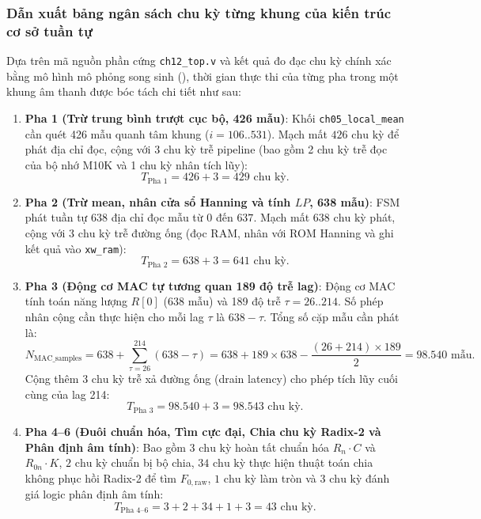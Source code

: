 \subsubsection*{Dẫn xuất bảng ngân sách chu kỳ từng khung của kiến trúc cơ sở tuần tự}
Dựa trên mã nguồn phần cứng \texttt{ch12\_top.v} và kết quả đo đạc chu kỳ chính xác bằng mô hình mô phỏng song sinh (), thời gian thực thi của từng pha trong một khung âm thanh được bóc tách chi tiết như sau:

\begin{enumerate}
    \item \textbf{Pha 1 (Trừ trung bình trượt cục bộ, 426 mẫu)}:
    Khối \texttt{ch05\_local\_mean} cần quét 426 mẫu quanh tâm khung ($i = 106..531$). Mạch mất $426\text{ chu kỳ}$ để phát địa chỉ đọc, cộng với $3\text{ chu kỳ}$ trễ pipeline (bao gồm 2 chu kỳ trễ đọc của bộ nhớ M10K và 1 chu kỳ nhân tích lũy):
    \begin{equation}
        T_{\text{Pha 1}} = 426 + 3 = 429\text{ chu kỳ}.
    \end{equation}

    \item \textbf{Pha 2 (Trừ mean, nhân cửa sổ Hanning và tính $LP$, 638 mẫu)}:
    FSM phát tuần tự 638 địa chỉ đọc mẫu từ $0$ đến $637$. Mạch mất $638\text{ chu kỳ}$ phát, cộng với $3\text{ chu kỳ}$ trễ đường ống (đọc RAM, nhân với ROM Hanning và ghi kết quả vào \texttt{xw\_ram}):
    \begin{equation}
        T_{\text{Pha 2}} = 638 + 3 = 641\text{ chu kỳ}.
    \end{equation}

    \item \textbf{Pha 3 (Động cơ MAC tự tương quan 189 độ trễ lag)}:
    Động cơ MAC tính toán năng lượng $R[0]$ (638 mẫu) và 189 độ trễ $\tau = 26..214$. Số phép nhân cộng cần thực hiện cho mỗi lag $\tau$ là $638 - \tau$. Tổng số cặp mẫu cần phát là:
    \begin{equation}
        N_{\text{MAC\_samples}} = 638 + \sum_{\tau=26}^{214} (638 - \tau) = 638 + 189 \times 638 - \frac{(26 + 214) \times 189}{2} = 98.540\text{ mẫu}.
    \end{equation}
    Cộng thêm $3\text{ chu kỳ}$ trễ xả đường ống (drain latency) cho phép tích lũy cuối cùng của lag 214:
    \begin{equation}
        T_{\text{Pha 3}} = 98.540 + 3 = 98.543\text{ chu kỳ}.
    \end{equation}

    \item \textbf{Pha 4--6 (Đuôi chuẩn hóa, Tìm cực đại, Chia chu kỳ Radix-2 và Phân định âm tính)}:
    Bao gồm $3\text{ chu kỳ}$ hoàn tất chuẩn hóa $R_n \cdot C$ và $R_{0n} \cdot K$, $2\text{ chu kỳ}$ chuẩn bị bộ chia, $34\text{ chu kỳ}$ thực hiện thuật toán chia không phục hồi Radix-2 để tìm $F_{0,\text{raw}}$, $1\text{ chu kỳ}$ làm tròn và $3\text{ chu kỳ}$ đánh giá logic phân định âm tính:
    \begin{equation}
        T_{\text{Pha 4--6}} = 3 + 2 + 34 + 1 + 3 = 43\text{ chu kỳ}.
    \end{equation}


\end{enumerate}
